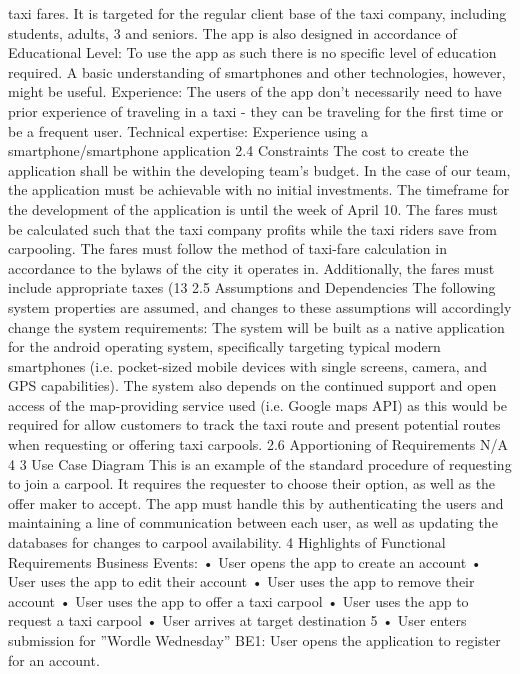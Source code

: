 taxi fares. It is targeted for the regular client base of the taxi company, including students, adults,
3
and seniors. The app is also designed in accordance of
Educational Level: To use the app as such there is no specific level of education required. A
basic understanding of smartphones and other technologies, however, might be useful.
Experience: The users of the app don’t necessarily need to have prior experience of traveling in
a taxi - they can be traveling for the first time or be a frequent user.
Technical expertise: Experience using a smartphone/smartphone application
2.4 Constraints
The cost to create the application shall be within the developing team’s budget. In the case of
our team, the application must be achievable with no initial investments.
The timeframe for the development of the application is until the week of April 10.
The fares must be calculated such that the taxi company profits while the taxi riders save from
carpooling.
The fares must follow the method of taxi-fare calculation in accordance to the bylaws of the city
it operates in. Additionally, the fares must include appropriate taxes (13%
2.5 Assumptions and Dependencies
The following system properties are assumed, and changes to these assumptions will accordingly
change the system requirements:
The system will be built as a native application for the android operating system, specifically
targeting typical modern smartphones (i.e. pocket-sized mobile devices with single screens, camera,
and GPS capabilities). The system also depends on the continued support and open access of the
map-providing service used (i.e. Google maps API) as this would be required for allow customers
to track the taxi route and present potential routes when requesting or offering taxi carpools.
2.6 Apportioning of Requirements
N/A
4
3 Use Case Diagram
This is an example of the standard procedure of requesting to join a carpool. It requires the
requester to choose their option, as well as the offer maker to accept. The app must handle this
by authenticating the users and maintaining a line of communication between each user, as well as
updating the databases for changes to carpool availability.
4 Highlights of Functional Requirements
Business Events:
• User opens the app to create an account
• User uses the app to edit their account
• User uses the app to remove their account
• User uses the app to offer a taxi carpool
• User uses the app to request a taxi carpool
• User arrives at target destination
5
• User enters submission for ”Wordle Wednesday”
BE1: User opens the application to register for an account.
